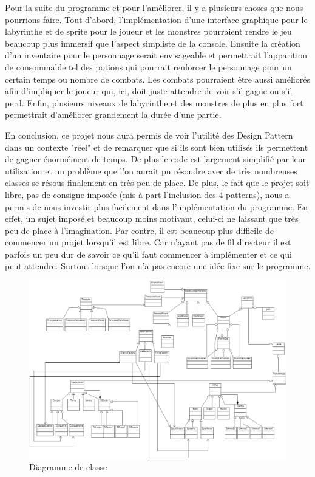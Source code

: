 \documentclass[a4paper]{article}
\begin{document}
Pour la suite du programme et pour l'améliorer, il y a plusieurs choses que nous pourrions faire.
Tout d'abord, l'implémentation d'une interface graphique pour le labyrinthe et de sprite pour le joueur et les monstres pourraient rendre le jeu beaucoup plus immersif que l'aspect simpliste de la console.
Ensuite la création d'un inventaire pour le personnage serait envisageable et permettrait l'apparition de consommable tel des potions qui pourrait renforcer le personnage pour un certain temps ou nombre de combats.
Les combats pourraient être aussi améliorés afin d'impliquer le joueur qui, ici, doit juste attendre de voir s’il gagne ou s’il perd.
Enfin, plusieurs niveaux de labyrinthe et des monstres de plus en plus fort permettrait d'améliorer grandement la durée d'une partie.

En conclusion, ce projet nous aura permis de voir l'utilité des Design Pattern dans un contexte "réel" et de remarquer que si ils sont bien utilisés ils permettent de gagner énormément de temps. De plus le code est largement simplifié par leur utilisation et un problème que l'on aurait pu résoudre avec de très nombreuses classes se résous finalement en très peu de place.
De plus, le fait que le projet soit libre, pas de consigne imposée (mis à part l’inclusion des 4 patterns), nous a permis de nous investir plus facilement dans l'implémentation du programme.
En effet, un sujet imposé et beaucoup moins motivant, celui-ci ne laissant que très peu de place à l'imagination.
Par contre, il est beaucoup plus difficile de commencer un projet lorsqu'il est libre. Car n'ayant pas de fil directeur il est parfois un peu dur de savoir ce qu'il faut commencer à implémenter et ce qui peut attendre. Surtout lorsque l’on n’a pas encore une idée fixe sur le programme.
\newpage
\begin{figure}[h]
        \centering
        \includegraphics[angle=90,width=17cm]{./DiagrammeDeClasse.png}
        \caption{\label{fig:diagClasse}Diagramme de classe}
      \end{figure}
\end{document}
